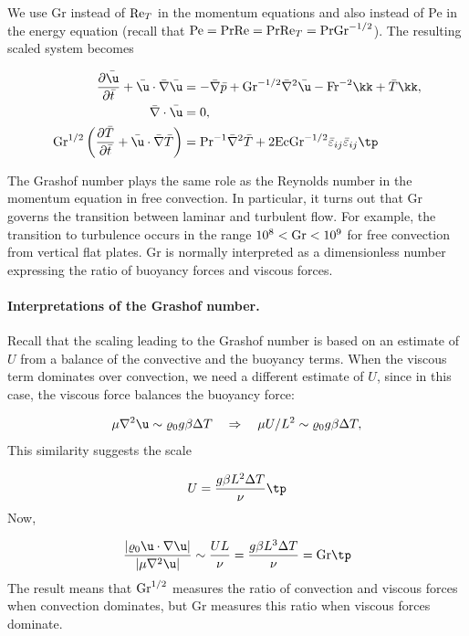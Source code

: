 \documentclass[graybox,envcountchap,sectrefs,final]{svmonodo}
\begin{document}
We use Gr instead of $\hbox{Re}_T$ in the momentum equations and also
instead of Pe in the energy equation (recall that $\hbox{Pe} =
\hbox{Pr}\hbox{Re} =
\hbox{Pr}\hbox{Re}_T=\hbox{Pr}\hbox{Gr}^{-1/2}$). The resulting scaled
system becomes

\begin{align}
\frac{\partial \bar\u}{\partial \bar t} +
\bar \u\cdot\bar \nabla\bar\u
&= -\bar\nabla \bar p + \hbox{Gr}^{-1/2}\bar \nabla^2\bar \u
- \hbox{Fr}^{-2}\kk  + \bar T \kk,
\label{scale:fluid:free_convection:eq:momentum_TB1}\\ 
\bar\nabla\cdot\bar\u & = 0,
\label{scale:fluid:free_convection:eq:cont_TB1}\\ 
\hbox{Gr}^{1/2}\left(\frac{\partial \bar T}{\partial \bar t} +
\bar\u\cdot\bar\nabla \bar T\right)
&= \hbox{Pr}^{-1}
\bar \nabla^2 \bar T + 2\hbox{Ec}\hbox{Gr}^{-1/2}
\bar\varepsilon_{ij}\bar\varepsilon_{ij}\tp
\label{scale:fluid:free_convection:eq:energy_TB1}
\end{align}

The Grashof number plays the same
role as the Reynolds number in the momentum equation in free
convection. In particular,
it turns out that Gr governs the transition between laminar and
turbulent flow.  For example, the transition to turbulence occurs in
the range $10^8 < \hbox{Gr} < 10^9$ for free convection from vertical
flat plates.  Gr is normally interpreted as a dimensionless number
expressing the ratio of buoyancy forces and viscous forces.

\paragraph{Interpretations of the Grashof number.}
Recall that the scaling leading to the Grashof number is based on an
estimate of $U$ from a balance of the convective and the buoyancy
terms. When the viscous term dominates over convection, we need a
different estimate of $U$, since in this case, the viscous force
balances the buoyancy force:

\[ \mu\nabla^2\u \sim \varrho_0g\beta\Delta T\quad
\Rightarrow\quad \mu U/L^2 \sim \varrho_0g\beta\Delta T,\]
This similarity suggests the scale

\[ U = \frac{g\beta L^2 \Delta T}{\nu}\tp\]
Now,

\[ \frac{|\varrho_0\u\cdot\nabla\u|}{|\mu\nabla^2\u|} \sim \frac{UL}{\nu}
= \frac{g\beta L^3 \Delta T}{\nu} = \hbox{Gr}\tp\]
The result means that $\hbox{Gr}^{1/2}$ measures the ratio of convection and
viscous forces when convection dominates, but Gr measures this ratio when
viscous forces dominate.
\end{document}
